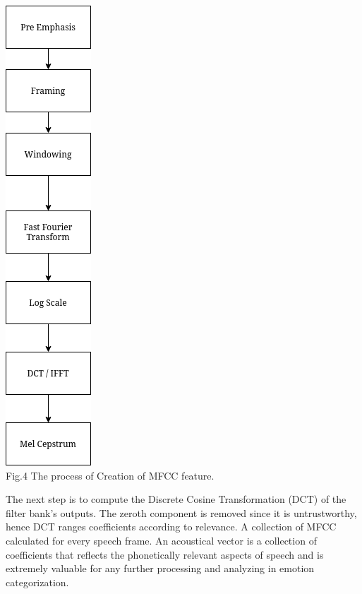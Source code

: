 \documentclass[11pt,a4paper]{article}
\begin{document}
    \begin{center}
    
    \includegraphics[scale=0.45]{MFCC_PIC.png} \\ 
    Fig.4 The process of Creation of MFCC feature. \\

\end{center} 
The next step is to compute the Discrete Cosine Transformation (DCT) of the filter bank's outputs. The zeroth component is removed since it is untrustworthy, hence DCT ranges coefficients according to relevance. A collection of MFCC  calculated for every speech frame. An acoustical vector is a collection of coefficients that reflects the phonetically relevant aspects of speech and is extremely valuable for any further processing and analyzing in emotion categorization. \\
\end{document}

